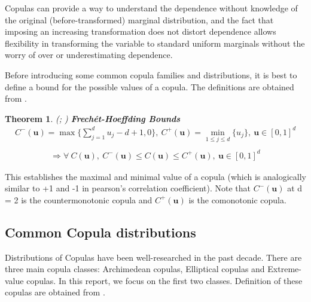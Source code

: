 \documentclass[12pt]{report}
\newtheorem{theorem}{Theorem}[subsection]
\newcommand{\1}{\mathbf{1}}
\begin{document}
Copulas can provide a way to understand the dependence without knowledge of the original (before-transformed) marginal distribution, and the fact that imposing an increasing transformation does not distort dependence allows flexibility in transforming the variable to standard uniform marginals without the worry of over or underestimating dependence. \\

\vspace{0.5cm}

Before introducing some common copula families and distributions, it is best to define a bound for the possible values of a copula. The definitions are obtained from \cite{HofertBook}. \\ 

\begin{theorem}\label{FrechetHoeffdingBound}
\textit{\normalfont (\cite{höffding1940maßstabinvariante}; \cite{FrechetBounds})}
\:\textbf{Frech\'et-Hoeffding Bounds} \\
\vspace{-0.8cm}
\begin{align*}
C^{-}(\boldsymbol{u}) = \max \{ \sum_{j = 1}^{d} u_{j} - d + 1, 0 \}, \:
C^{+}(\boldsymbol{u}) = \min_{1 \le j \le d} \{u_{j}\}
, \: \boldsymbol{u} \in [0, 1]^d \\
\end{align*}
\vspace{-2.5cm}
\begin{align*}
\Rightarrow \forall \: C(\boldsymbol{u}), \: C^{-}(\boldsymbol{u}) \le C(\boldsymbol{u}) \le C^{+}(\boldsymbol{u}), \: \boldsymbol{u} \in [0, 1]^d
\end{align*}
\end{theorem}

This establishes the maximal and minimal value of a copula (which is analogically similar to +1 and -1 in pearson's correlation coefficient). Note that $C^{-}(\boldsymbol{u})$ at d = 2 is the countermonotonic copula and $C^{+}(\boldsymbol{u})$ is the comonotonic copula.\\


\subsection{Common Copula distributions}
\vspace{0.5cm}
Distributions of Copulas have been well-researched in the past decade. There are three main copula classes: Archimedean copulas, Elliptical copulas and Extreme-value copulas. In this report, we focus on the first two classes. Definition of these copulas are obtained from \cite{HofertBook}.
\end{document}
